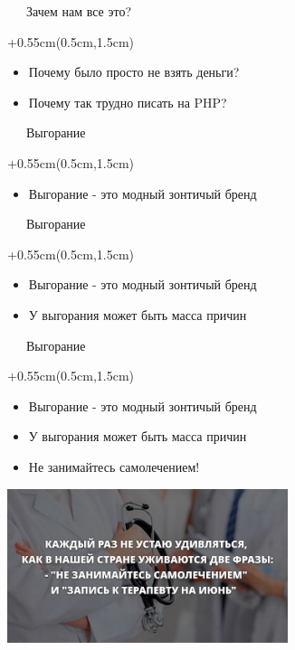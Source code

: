 \documentclass[xetex,18pt,aspectratio=169]{beamer}
\begin{document}
\begin{Large}
\begin{frame}{\ \ \ Зачем нам все это?}
\begin{textblock*}{\framewidth+0.55cm}(0.5cm,1.5cm)
\begin{itemize}
  \item Почему было просто не взять деньги?
  \item Почему так трудно писать на PHP?
\end{itemize}
\end{textblock*}
\end{frame}

\begin{frame}{\ \ \ Выгорание}
\begin{textblock*}{\framewidth+0.55cm}(0.5cm,1.5cm)
\begin{itemize}
  \item Выгорание - это модный зонтичый бренд
\end{itemize}
\end{textblock*}
\end{frame}

\begin{frame}{\ \ \ Выгорание}
\begin{textblock*}{\framewidth+0.55cm}(0.5cm,1.5cm)
\begin{itemize}
  \item Выгорание - это модный зонтичый бренд
  \item У выгорания может быть масса причин
\end{itemize}
\end{textblock*}
\end{frame}

\begin{frame}{\ \ \ Выгорание}
\begin{textblock*}{\framewidth+0.55cm}(0.5cm,1.5cm)
\begin{itemize}
  \item Выгорание - это модный зонтичый бренд
  \item У выгорания может быть масса причин
  \item Не занимайтесь самолечением!
\end{itemize}
\begin{minipage}{\textwidth}
  \centering
  \includegraphics[height=4.5cm]{img/samo}
\end{minipage}
\end{textblock*}
\end{frame}


\end{Large}
\end{document}
